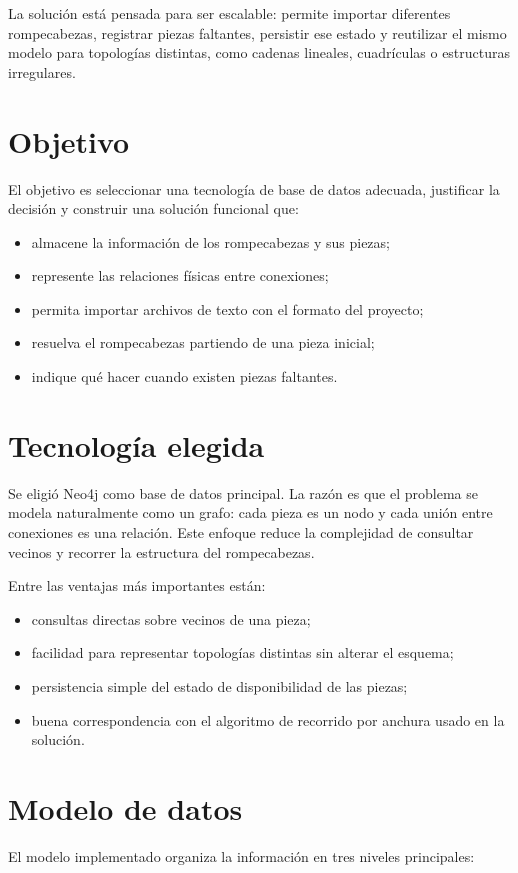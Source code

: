 \documentclass[11pt,a4paper]{article}
\begin{document}
La solución está pensada para ser escalable: permite importar diferentes rompecabezas, registrar piezas faltantes, persistir ese estado y reutilizar el mismo modelo para topologías distintas, como cadenas lineales, cuadrículas o estructuras irregulares.

\section{Objetivo}
El objetivo es seleccionar una tecnología de base de datos adecuada, justificar la decisión y construir una solución funcional que:
\begin{itemize}[leftmargin=1.2cm]
    \item almacene la información de los rompecabezas y sus piezas;
    \item represente las relaciones físicas entre conexiones;
    \item permita importar archivos de texto con el formato del proyecto;
    \item resuelva el rompecabezas partiendo de una pieza inicial;
    \item indique qué hacer cuando existen piezas faltantes.
\end{itemize}

\section{Tecnología elegida}
Se eligió Neo4j como base de datos principal. La razón es que el problema se modela naturalmente como un grafo: cada pieza es un nodo y cada unión entre conexiones es una relación. Este enfoque reduce la complejidad de consultar vecinos y recorrer la estructura del rompecabezas.

Entre las ventajas más importantes están:
\begin{itemize}[leftmargin=1.2cm]
    \item consultas directas sobre vecinos de una pieza;
    \item facilidad para representar topologías distintas sin alterar el esquema;
    \item persistencia simple del estado de disponibilidad de las piezas;
    \item buena correspondencia con el algoritmo de recorrido por anchura usado en la solución.
\end{itemize}

\section{Modelo de datos}
El modelo implementado organiza la información en tres niveles principales:
\end{document}
